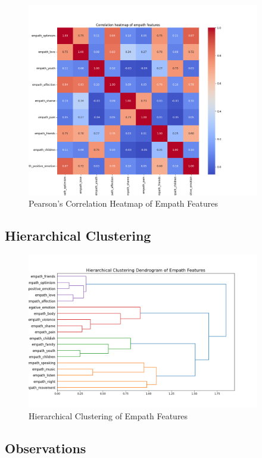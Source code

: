\begin{center}
\begin{figure}[H]
  \centering
  \includegraphics[width=4in]{img/corr_heatmap_empath.png}
  \caption{Pearson's Correlation Heatmap of Empath Features}
  \label{Figure:fig_beh}
\end{figure}
\end{center}

\subsection*{Hierarchical Clustering}
\label{sec:hierarchicalclustering}

\begin{center}
\begin{figure}[H]
  \centering
  \includegraphics[width=4in]{img/dendrogram_empath.png}
  \caption{Hierarchical Clustering of Empath Features}
  \label{Figure:dendrogram_spotify_features}
\end{figure}
\end{center}


\subsection*{Observations}

